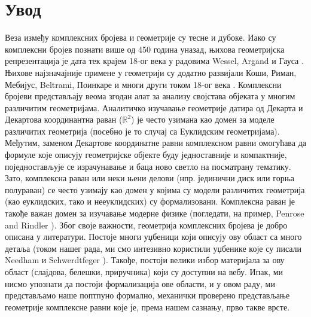 \section{Увод}
Веза између комплексних бројева и геометрије су тесне и дубоке. Иако
су комплексни бројев познати више од 450 година уназад, њихова
геометријска репрезентација је дата тек крајем 18-ог века у радовима
Wessel, Argand и Гауса \cite{needham}. Њихове најзначајније примене у
геометрији су додатно развијали Коши, Риман, Мебијус, Beltrami,
Поинкаре и многи други током 18-ог века \cite{needham}. Комплексни
бројеви представљају веома згодан алат за анализу својстава објеката у
многим различитим геометријама. Аналитичко изучавање геометрије датира
од Декарта и Декартова координантна раван ($\mathbb{R}^2$) је често
узимана као домен за моделе различитих геометрија (посебно је то
случај са Еуклидским геометријама). Међутим, заменом Декартове
координатне равни комплексном равни омогућава да формуле које описују
геометријске објекте буду једноставније и компактније, поједностављује
се израчунавање и баца ново светло на посматрану тематику. Зато,
комплексна раван или неки њени делови (нпр. јединични диск или горња
полураван) се често узимају као домен у којима су модели различитих
геометрија (као еуклидских, тако и нееуклидских) су формализовани.
Комплексна раван је такође важан домен за изучавање модерне физике
(погледати, на пример, Penrose and Rindler \cite{penrose}). Због своје
важности, геометрија комплексних бројева је добро описана у
литератури. Постоје многи уџбеници који описују ову област са много
детаља (током нашег рада, ми смо интезивно користили уџбенике које су
писали Needham \cite{needham} и Schwerdtfeger \cite{schwerdtfeger}).
Такође, постоји велики избор материјала за ову област (слајдова,
белешки, приручника) који су доступни на вебу. Ипак, ми нисмо упознати
да постоји формализација ове области, и у овом раду, ми представљамо
наше поптпуно формално, механички проверено представљање геометрије
комплексне равни које је, према нашем сазнању, прво такве врсте.

